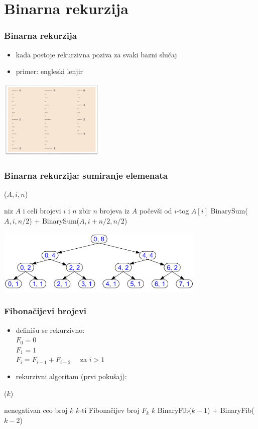 \documentclass[compress,aspectratio=169]{beamer}
\begin{document}
\section[Binarna rekurzija]{Binarna rekurzija}
\begin{frame}[fragile]
  \frametitle{Binarna rekurzija}
  \begin{itemize}
    \item kada postoje  rekurzivna poziva za svaki bazni slučaj
    \item primer: engleski lenjir
  \end{itemize}
  \begin{center}
    \includegraphics[width=5cm]{asp-02-pic02.png}
  \end{center}
\end{frame}

\begin{frame}[fragile]
  \frametitle{Binarna rekurzija: sumiranje elemenata}
($A, i, n$)
\begin{algorithmic}
\REQUIRE niz $A$ i celi brojevi $i$ i $n$
\ENSURE zbir $n$ brojeva iz $A$ počevši od $i$-tog
  \RETURN $A[i]$
\ELSE
  \RETURN BinarySum($A, i, n/2$) + BinarySum($A, i+n/2, n/2$)
\ENDIF
\end{algorithmic}
  \begin{center}
    \includegraphics[width=10cm]{asp-02-pic07.png}
  \end{center}
\end{frame}

\begin{frame}[fragile]
  \frametitle{Fibonačijevi brojevi}
\begin{itemize}
  \item definišu se rekurzivno: \\
  $ F_0 = 0$ \\
  $ F_1 = 1$ \\
  $ F_i = F_{i-1} + F_{i-2} \quad $ za $i>1$ 
  \item rekurzivni algoritam (prvi pokušaj):
\end{itemize}
($k$)
\begin{algorithmic}
\REQUIRE nenegativan ceo broj $k$
\ENSURE $k$-ti Fibonačijev broj $F_k$
  \RETURN $k$
\ELSE
  \RETURN BinaryFib($k-1$) + BinaryFib($k-2$)
\ENDIF
\end{algorithmic}
\end{frame}
\end{document}
